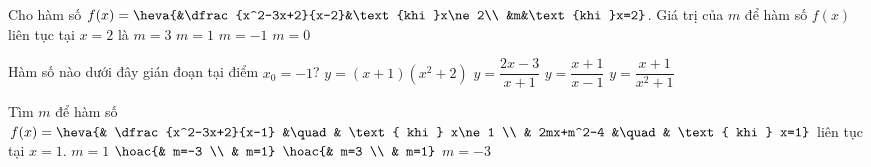 \begin{ex}%
	Cho  hàm số $f(x)=\heva{&\dfrac{x^2-3x+2}{x-2}&\text{khi }x\ne 2\\
	&m&\text{khi }x=2}$. Giá trị của $m$ để hàm số $f(x)$ liên  tục tại $x=2$ là
	 \choice
		{$m=3$} 
		{\True $m=1$} 
		 {$m=-1$}
		{$m=0$} 
\end{ex}

\begin{ex}%
	Hàm  số nào dưới đây gián đoạn tại điểm $x_0=-1$?
	 \choice
		{$y=\left( x+1 \right)\left( x^2+2 \right)$} 
		{\True  $y=\dfrac{2x-3}{x+1}$}
		{$y=\dfrac{x+1}{x-1}$} 
		{$y=\dfrac{x+1}{x^2+1}$} 
\end{ex}

\begin{ex}%
	Tìm $m$ để hàm số $f(x)=\heva{& \dfrac{x^2-3x+2}{x-1} &\quad&  \text{ khi } x\ne 1 \\ & 2mx+m^2-4 &\quad& \text{ khi } x=1}$ liên tục tại $x=1$.
	\choice 
		{$m=1$} 
		{\True $\hoac{&  m=-3 \\ & m=1}$}
		{$\hoac{& m=3 \\ &  m=1}$}
		 {$m=-3$}
\end{ex}

